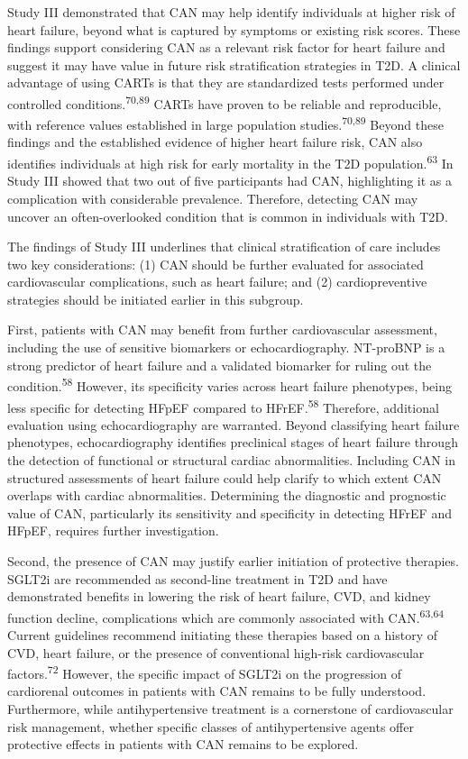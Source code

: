 \documentclass[
  a4paper,
  headsepline=true,
  open=left]{scrbook}
\begin{document}
Study III demonstrated that CAN may help identify individuals at higher
risk of heart failure, beyond what is captured by symptoms or existing
risk scores. These findings support considering CAN as a relevant risk
factor for heart failure and suggest it may have value in future risk
stratification strategies in T2D. A clinical advantage of using CARTs is
that they are standardized tests performed under controlled
conditions.\textsuperscript{70,89} CARTs have proven to be reliable and
reproducible, with reference values established in large population
studies.\textsuperscript{70,89} Beyond these findings and the
established evidence of higher heart failure risk, CAN also identifies
individuals at high risk for early mortality in the T2D
population.\textsuperscript{63} In Study III showed that two out of five
participants had CAN, highlighting it as a complication with
considerable prevalence. Therefore, detecting CAN may uncover an
often-overlooked condition that is common in individuals with T2D.

The findings of Study III underlines that clinical stratification of
care includes two key considerations: (1) CAN should be further
evaluated for associated cardiovascular complications, such as heart
failure; and (2) cardiopreventive strategies should be initiated earlier
in this subgroup.

First, patients with CAN may benefit from further cardiovascular
assessment, including the use of sensitive biomarkers or
echocardiography. NT-proBNP is a strong predictor of heart failure and a
validated biomarker for ruling out the condition.\textsuperscript{58}
However, its specificity varies across heart failure phenotypes, being
less specific for detecting HFpEF compared to HFrEF.\textsuperscript{58}
Therefore, additional evaluation using echocardiography are warranted.
Beyond classifying heart failure phenotypes, echocardiography identifies
preclinical stages of heart failure through the detection of functional
or structural cardiac abnormalities. Including CAN in structured
assessments of heart failure could help clarify to which extent CAN
overlaps with cardiac abnormalities. Determining the diagnostic and
prognostic value of CAN, particularly its sensitivity and specificity in
detecting HFrEF and HFpEF, requires further investigation.

Second, the presence of CAN may justify earlier initiation of protective
therapies. SGLT2i are recommended as second-line treatment in T2D and
have demonstrated benefits in lowering the risk of heart failure, CVD,
and kidney function decline, complications which are commonly associated
with CAN.\textsuperscript{63,64} Current guidelines recommend initiating
these therapies based on a history of CVD, heart failure, or the
presence of conventional high-risk cardiovascular
factors.\textsuperscript{72} However, the specific impact of SGLT2i on
the progression of cardiorenal outcomes in patients with CAN remains to
be fully understood. Furthermore, while antihypertensive treatment is a
cornerstone of cardiovascular risk management, whether specific classes
of antihypertensive agents offer protective effects in patients with CAN
remains to be explored.
\end{document}
